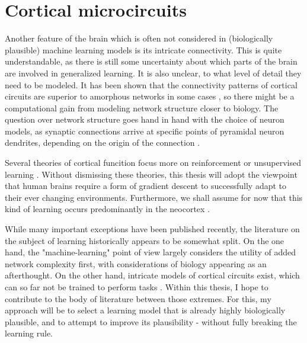 

\section{Cortical microcircuits}

Another feature of the brain which is often not considered in (biologically plausible) machine learning models is its
intricate connectivity. This is quite understandable, as there is still some uncertainty about which parts of the brain
are involved in generalized learning. It is also unclear, to what level of detail they need to be modeled. It has been
shown that the connectivity patterns of cortical circuits are superior to amorphous networks in some cases
\citep{haeusler2007statistical}, so there might be a computational gain from modeling network structure closer to
biology. The question over network structure goes hand in hand with the choice of neuron models, as synaptic connections
arrive at specific points of pyramidal neuron dendrites, depending on the origin of the connection
\citep{felleman1991distributed,Ishizuka1995,Larkum2018}.

Several theories of cortical funcition focus more on reinforcement \citep{Legenstein2008} or unsupervised learning
\citep{George2009,haeusler2017}. Without dismissing these theories, this thesis will adopt the viewpoint that human
brains require a form of gradient descent to successfully adapt to their ever changing environments. Furthermore, we
shall assume for now that this kind of learning occurs predominantly in the neocortex \citep{Marblestone2016}.

While many important exceptions have been published recently, the literature on the subject of learning historically
appears to be somewhat split. On the one hand, the "machine-learning" point of view largely considers the utility of
added network complexity first, with considerations of biology appearing as an afterthought\citeme. On the other hand,
intricate models of cortical circuits exist, which can so far not be trained to perform tasks
\cite{potjans2014cell,schmidt2018multi,van2022bringing}. Within this thesis, I hope to contribute to the body of
literature between those extremes. For this, my approach will be to select a learning model that is already highly
biologically plausible, and to attempt to improve its plausibility - without fully breaking the learning rule.


